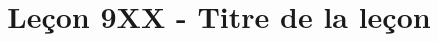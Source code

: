 \documentclass{article}
\title{Leçon 9XX - Titre de la leçon}
\begin{document}
\maketitle

\secrapports

\secindispensables

\secpieges

\secidees

\secquestionsclassiques

\secreferences

\begin{itemize}

\end{itemize}

\secdev

\begin{itemize}

\end{itemize}
\end{document}
